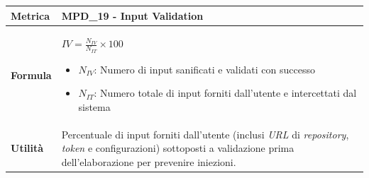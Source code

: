 \documentclass[12pt, a4paper]{article}
\begin{document}
\begin{table}[H]
\centering
\renewcommand{\arraystretch}{1.5}
\begin{tabular}{|l|p{12cm}|}
\hline
\textbf{Metrica} & MPD\_19 - Input Validation \\ \hline
\textbf{Formula} & $IV = \frac{N_{IV}}{N_{IT}} \times 100$
\begin{itemize}
    \item $N_{IV}$: Numero di input sanificati e validati con successo
    \item $N_{IT}$: Numero totale di input forniti dall'utente e intercettati dal sistema
\end{itemize} \\ \hline
\textbf{Utilità} & Percentuale di input forniti dall'utente (inclusi \textit{URL} di \textit{repository}, \textit{token} e configurazioni) sottoposti a validazione prima dell'elaborazione per prevenire iniezioni. \\ \hline
\end{tabular}
\end{table}
\end{document}

